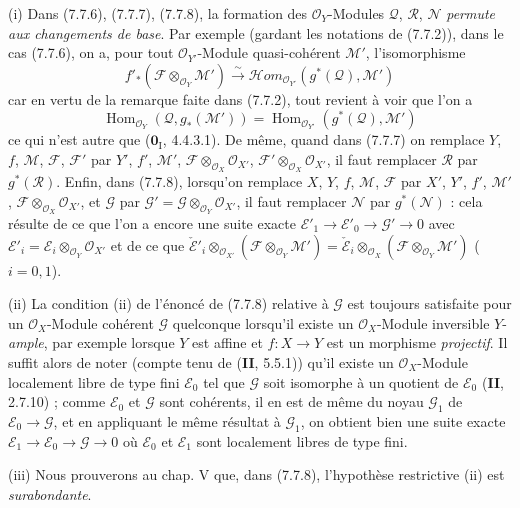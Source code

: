 \begin{remarks}[7.7.9]
\textnormal{(i)} Dans (7.7.6), (7.7.7), (7.7.8), la formation des
$\mathscr O_Y$-Modules $\mathscr Q$, $\mathscr R$, $\mathscr N$ \emph{permute aux
changements de base}. Par exemple (gardant les notations de (7.7.2)), dans le
cas (7.7.6), on a, pour tout $\mathscr O_{Y'}$-Module quasi-cohérent
$\mathscr M'$, l'isomorphisme
\[
  f'_*(\mathscr F\otimes_{\mathscr O_Y}\mathscr M')
  \xrightarrow{\sim}
  \mathscr{H}\!om_{\mathscr O_{Y'}}(g^*(\mathscr Q),\mathscr M')
\]
car en vertu de la remarque faite dans (7.7.2), tout revient à voir que l'on a
\[
  \operatorname{Hom}_{\mathscr O_Y}(\mathscr Q,g_*(\mathscr M'))
  =
  \operatorname{Hom}_{\mathscr O_{Y'}}(g^*(\mathscr Q),\mathscr M')
\]
ce qui n'est autre que ($\mathbf{0}_{\mathrm I}$, 4.4.3.1). De même, quand dans (7.7.7)
on remplace $Y$, $f$, $\mathscr M$, $\mathscr F$, $\mathscr F'$ par $Y'$, $f'$,
$\mathscr M'$, $\mathscr F\otimes_{\mathscr O_X}\mathscr O_{X'}$,
$\mathscr F'\otimes_{\mathscr O_X}\mathscr O_{X'}$, il faut remplacer
$\mathscr R$ par $g^*(\mathscr R)$. Enfin, dans (7.7.8), lorsqu'on remplace $X$,
$Y$, $f$, $\mathscr M$, $\mathscr F$ par $X'$, $Y'$, $f'$, $\mathscr M'$,
$\mathscr F\otimes_{\mathscr O_X}\mathscr O_{X'}$, et $\mathscr G$ par
$\mathscr G'=\mathscr G\otimes_{\mathscr O_Y}\mathscr O_{X'}$, il faut remplacer
$\mathscr N$ par $g^*(\mathscr N)$ : cela résulte de ce que l'on a encore une
suite exacte
$\mathscr E'_1\longrightarrow\mathscr E'_0\longrightarrow\mathscr G'\longrightarrow0$ avec
$\mathscr E'_i=\mathscr E_i\otimes_{\mathscr O_Y}\mathscr O_{X'}$
et de ce que
$  \check{\mathscr E}'_i
  \otimes_{\mathscr O_{X'}}
  (\mathscr F\otimes_{\mathscr O_Y}\mathscr M')
  =
  \check{\mathscr E}_i
  \otimes_{\mathscr O_X}
  (\mathscr F\otimes_{\mathscr O_Y}\mathscr M')$ ($i=0,1$).

\medskip
\textnormal{(ii)} La condition (ii) de l'énoncé de (7.7.8) relative à
$\mathscr G$ est toujours satisfaite pour un $\mathscr O_X$-Module cohérent
$\mathscr G$ quelconque lorsqu'il existe un $\mathscr O_X$-Module inversible
$Y$-\emph{ample}, par exemple lorsque $Y$ est affine et $f:X\to Y$ est un morphisme
\emph{projectif}. Il suffit alors de noter (compte tenu de (\textbf{II}, 5.5.1)) qu'il existe un
$\mathscr O_X$-Module localement libre de type fini $\mathscr E_0$ tel que
$\mathscr G$ soit isomorphe à un quotient de $\mathscr E_0$ (\textbf{II}, 2.7.10) ; comme
$\mathscr E_0$ et $\mathscr G$ sont cohérents, il en est de même du noyau
$\mathscr G_1$ de $\mathscr E_0\to\mathscr G$, et en appliquant le même résultat
à $\mathscr G_1$, on obtient bien une suite exacte
$\mathscr E_1\to\mathscr E_0\to\mathscr G\to0$ où $\mathscr E_0$ et
$\mathscr E_1$ sont localement libres de type fini.

\medskip
\textnormal{(iii)} Nous prouverons au chap. V que, dans (7.7.8), l'hypothèse
restrictive (ii) est \emph{surabondante}.
\end{remarks}

